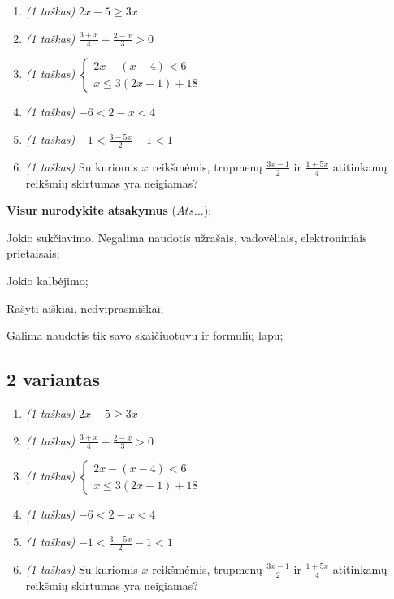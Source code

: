\documentclass[a4paper]{article}
\begin{document}
\begin{enumerate}
      \item \textit{(1 taškas)} $2x-5 \geqslant 3x$
      \item \textit{(1 taškas)} $\frac{3+x}{4}+\frac{2-x}{3}>0$
      \item \textit{(1 taškas)}
      \(
      \left\{\begin{matrix}
            2x-(x-4) < 6 \\
            x \leqslant 3(2x-1)+18
      \end{matrix}\right.
      \)
      \item \textit{(1 taškas)} $-6<2-x<4 $
      \item \textit{(1 taškas)} $-1<\frac{3-5x}{2}-1 < 1$
      \item \textit{(1 taškas)} Su kuriomis $x$ reikšmėmis, trupmenų $\frac{3x-1}{2}$ ir $\frac{1+5x}{4}$ atitinkamų reikšmių skirtumas yra neigiamas?
\end{enumerate}

\begin{small}
      \begin{enumerate*}[label={(\arabic*)}]
            \item \textbf{Visur} \textbf{nurodykite atsakymus} ($Ats\ldots$);
            \item Jokio sukčiavimo. Negalima naudotis užrašais, vadovėliais,
            elektroniniais prietaisais;
            \item Jokio kalbėjimo;
            \item Rašyti aiškiai, nedviprasmiškai;
            \item Galima naudotis tik savo skaičiuotuvu ir formulių lapu;
      \end{enumerate*}
\end{small}

\vspace*{3mm}

\subsection*{2 variantas}

\begin{enumerate}
      \item \textit{(1 taškas)} $2x-5 \geqslant 3x$
      \item \textit{(1 taškas)} $\frac{3+x}{4}+\frac{2-x}{3}>0$
      \item \textit{(1 taškas)}
      \(
      \left\{\begin{matrix}
            2x-(x-4) < 6 \\
            x \leqslant 3(2x-1)+18
      \end{matrix}\right.
      \)
      \item \textit{(1 taškas)} $-6<2-x<4 $
      \item \textit{(1 taškas)} $-1<\frac{3-5x}{2}-1 < 1$
      \item \textit{(1 taškas)} Su kuriomis $x$ reikšmėmis, trupmenų $\frac{3x-1}{2}$ ir $\frac{1+5x}{4}$ atitinkamų reikšmių skirtumas yra neigiamas?
\end{enumerate}
\end{document}
